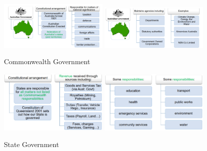 \documentclass{report}
\begin{document}
	\begin{figure}[htbp]
		\centering
		\includegraphics[width=0.47\textwidth]{images/figures/Comgov.png}
		\hfill
		\includegraphics[width=0.47\textwidth]{images/figures/comgov2.png}
		\caption{Commonwealth Government}
		\label{fig:two_images}
	\end{figure}

	\begin{figure}[htbp]
		\centering
		\includegraphics[width=0.47\textwidth]{images/figures/state1.png}
		\hfill
		\includegraphics[width=0.47\textwidth]{images/figures/state2.png}
		\caption{State Government}
		\label{fig:two_images}
	\end{figure}
\end{document}
